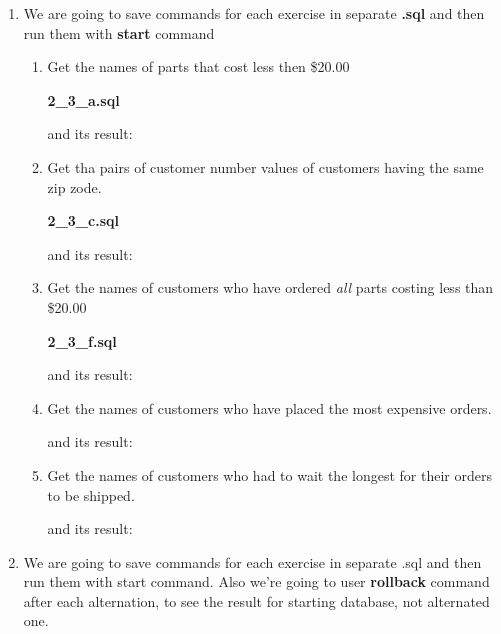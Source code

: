 \documentclass{article}
\newenvironment{answer}%
{\begin{framed}%
\vspace{0.5cm}}%
{\end{framed}\vspace{0.5cm}}
\begin{document}
	\begin{answer}
		\begin{enumerate}
			\item We are going to save commands for each exercise in separate \textbf{.sql} and then run them with \textbf{start} command
				\begin{enumerate}
					\item Get the names of parts that cost less then \$20.00

					\textbf{2\_3\_a.sql}
					

					and its result:

							
					\setcounter{enumii}{2}
					\item  Get tha pairs of customer number values of customers having the same zip zode.

					\textbf{2\_3\_c.sql}
					

					and its result:
					

					\setcounter{enumii}{5}	
					\item Get the names of customers who have ordered \emph{all} parts costing less than \$20.00

					\textbf{2\_3\_f.sql}
					

					and its result:
					

					\setcounter{enumii}{9}
					\item Get the names of customers who have placed the most expensive orders.
					

					and its result:
					

					\setcounter{enumii}{13}
					\item Get the names of customers who had to wait the longest for their orders to be shipped.
					

					and its result:
					
				\end{enumerate}


			\item We are going to save commands for each exercise in separate .sql and then run them with start command. Also we're going to user \textbf{rollback} command after each alternation, to see the result for starting database, not alternated one.


\end{enumerate}
\end{answer}
\end{document}
